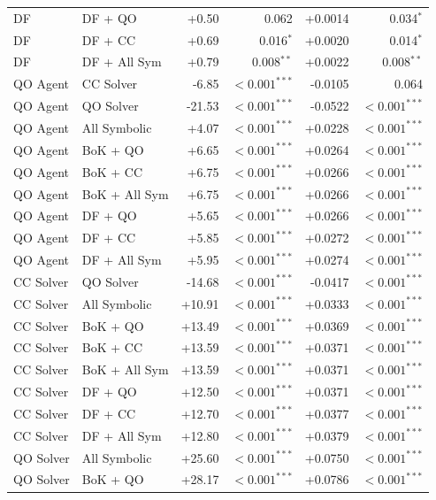 \begin{table}[!tbh]
{\begin{tabular}{llrrrr}
DF & DF + QO & +0.50 & 0.062 & +0.0014 & 0.034$^{*}$ \\
DF & DF + CC & +0.69 & 0.016$^{*}$ & +0.0020 & 0.014$^{*}$ \\
DF & DF + All Sym & +0.79 & 0.008$^{**}$ & +0.0022 & 0.008$^{**}$ \\
QO Agent & CC Solver & -6.85 & $<\!0.001^{***}$ & -0.0105 & 0.064 \\
QO Agent & QO Solver & -21.53 & $<\!0.001^{***}$ & -0.0522 & $<\!0.001^{***}$ \\
QO Agent & All Symbolic & +4.07 & $<\!0.001^{***}$ & +0.0228 & $<\!0.001^{***}$ \\
QO Agent & BoK + QO & +6.65 & $<\!0.001^{***}$ & +0.0264 & $<\!0.001^{***}$ \\
QO Agent & BoK + CC & +6.75 & $<\!0.001^{***}$ & +0.0266 & $<\!0.001^{***}$ \\
QO Agent & BoK + All Sym & +6.75 & $<\!0.001^{***}$ & +0.0266 & $<\!0.001^{***}$ \\
QO Agent & DF + QO & +5.65 & $<\!0.001^{***}$ & +0.0266 & $<\!0.001^{***}$ \\
QO Agent & DF + CC & +5.85 & $<\!0.001^{***}$ & +0.0272 & $<\!0.001^{***}$ \\
QO Agent & DF + All Sym & +5.95 & $<\!0.001^{***}$ & +0.0274 & $<\!0.001^{***}$ \\
CC Solver & QO Solver & -14.68 & $<\!0.001^{***}$ & -0.0417 & $<\!0.001^{***}$ \\
CC Solver & All Symbolic & +10.91 & $<\!0.001^{***}$ & +0.0333 & $<\!0.001^{***}$ \\
CC Solver & BoK + QO & +13.49 & $<\!0.001^{***}$ & +0.0369 & $<\!0.001^{***}$ \\
CC Solver & BoK + CC & +13.59 & $<\!0.001^{***}$ & +0.0371 & $<\!0.001^{***}$ \\
CC Solver & BoK + All Sym & +13.59 & $<\!0.001^{***}$ & +0.0371 & $<\!0.001^{***}$ \\
CC Solver & DF + QO & +12.50 & $<\!0.001^{***}$ & +0.0371 & $<\!0.001^{***}$ \\
CC Solver & DF + CC & +12.70 & $<\!0.001^{***}$ & +0.0377 & $<\!0.001^{***}$ \\
CC Solver & DF + All Sym & +12.80 & $<\!0.001^{***}$ & +0.0379 & $<\!0.001^{***}$ \\
QO Solver & All Symbolic & +25.60 & $<\!0.001^{***}$ & +0.0750 & $<\!0.001^{***}$ \\
QO Solver & BoK + QO & +28.17 & $<\!0.001^{***}$ & +0.0786 & $<\!0.001^{***}$ \\

\end{tabular}}
\end{table}
